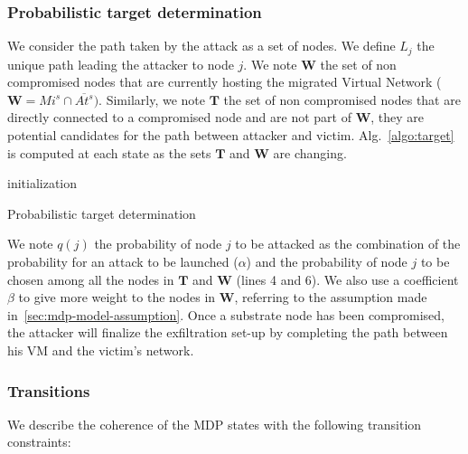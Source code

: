 \subsubsection{Probabilistic target determination}
\label{sec:target_proba}
We consider the path taken by the attack as a set of nodes.
We define $L_j$ the unique path leading the attacker to node $j$.
We note $\textbf{W}$ the set of non compromised nodes that are currently hosting the migrated Virtual Network (\ie $\textbf{W} = Mi^s \cap \overline{At^s})$.
Similarly, we note $\textbf{T}$ the set of non compromised nodes that are directly connected to a compromised node and are not part of $\textbf{W}$, \ie they are potential candidates for the path between attacker and victim. Alg.~\ref{algo:target} is computed at each state as the sets $\textbf{T}$ and $\textbf{W}$ are changing.
\begin{algorithm}
 initialization\;
 \caption{Probabilistic target determination}
 \label{algo:target}
\end{algorithm}


We note $q(j)$ the probability of node $j$ to be attacked as the combination of the probability for an attack to be launched (\ie $\alpha$) and the probability of node $j$ to be chosen among all the nodes in $\textbf{T}$ and $\textbf{W}$ (lines 4 and 6). We also use a coefficient $\beta$ to give more weight to the nodes in $\textbf{W}$, referring to the assumption made in~\ref{sec:mdp-model-assumption}.
Once a substrate node has been compromised, the attacker will finalize the exfiltration set-up by completing the path between his VM and the victim's network.


\subsubsection{Transitions}
We describe the coherence of the MDP states with the following transition constraints:

